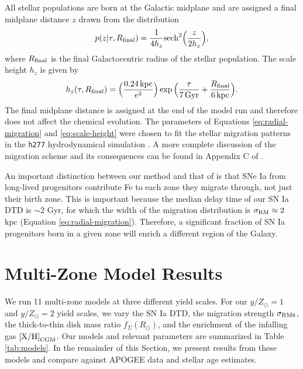 \documentclass[twocolumn,twocolappendix,linenumbers]{aastex631}
\newcommand{\yZ}[1]{$y/Z_\odot=#1$}
\newcommand{\kpc}{\,{\rm kpc}}
\begin{document}
All stellar populations are born at the Galactic midplane and are assigned a final midplane distance $z$ drawn from the distribution
\begin{equation}
    p(z|\tau,R_{\rm final}) = \frac{1}{4 h_z} {\rm sech}^2\Big(\frac{z}{2 h_z}\Big),
    \label{eq:sech-pdf}
\end{equation}
\citep{spitzer_dynamics_1942} where $R_{\rm final}$ is the final Galactocentric radius of the stellar population. The scale height $h_z$ is given by
\begin{equation}
    h_z(\tau,R_{\rm final}) = \Big(\frac{0.24\kpc}{e^2}\Big) \exp\Big(\frac{\tau}{7\,{\rm Gyr}} + \frac{R_{\rm final}}{6\kpc}\Big).
    \label{eq:scale-height}
\end{equation}
The final midplane distance is assigned at the end of the model run and therefore does not affect the chemical evolution. The parameters of Equations \ref{eq:radial-migration} and \ref{eq:scale-height} were chosen to fit the stellar migration patterns in the {\tt h277} hydrodynamical simulation \citep{christensen_implementing_2012}. A more complete discussion of the migration scheme and its consequences can be found in Appendix C of \citet{dubay_galactic_2024}.

An important distinction between our method and that of \citet{spitoni_effect_2015} is that SNe Ia from long-lived progenitors contribute Fe to each zone they migrate through, not just their birth zone. This is important because the median delay time of our SN Ia DTD is $\sim2$ Gyr, for which the width of the migration distribution is $\sigma_{\rm RM}\approx2$ kpc (Equation \ref{eq:radial-migration}). Therefore, a significant fraction of SN Ia progenitors born in a given zone will enrich a different region of the Galaxy.

\section{Multi-Zone Model Results}
\label{sec:multizone-results}

We run 11 multi-zone models at three different yield scales. For our \yZ{1} and \yZ{2} yield scales, we vary the SN Ia DTD, the migration strength $\sigma_{\rm RM8}$, the thick-to-thin disk mass ratio $f_\Sigma(R_\odot)$, and the enrichment of the infalling gas ${\rm [X/H]}_{\rm CGM}$. Our models and relevant parameters are summarized in Table \ref{tab:models}. In the remainder of this Section, we present results from these models and compare against APOGEE data and stellar age estimates.
\end{document}

